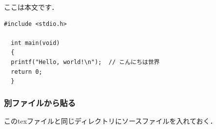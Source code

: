 ここは本文です．\\

\begin{lstlisting}[caption = 大きな人参．, label = code01]
  #include <stdio.h>

  int main(void)
  {
  printf("Hello, world!\n");  // こんにちは世界
  return 0;
  }
\end{lstlisting}

\subsubsection{別ファイルから貼る}

このtexファイルと同じディレクトリにソースファイルを入れておく．\\




